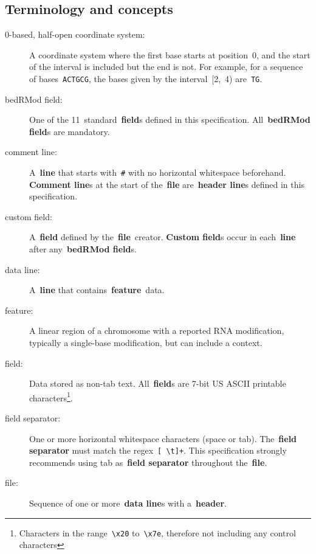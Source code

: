 \documentclass[11pt]{article}
\begin{document}
\subsection{Terminology and concepts}\label{sec:terms}
\begin{description}
\item[0-based, half-open coordinate system:]
  A coordinate system where the first base starts at position~0, and the start of the interval is included but the end is not.
  For example, for a sequence of bases~\texttt{ACTGCG}, the bases given by the interval~[2,~4) are~\texttt{TG}. %

\item[\acs{bedRMod} field:]
  One of the 11~standard~\textbf{field}s defined in this specification.
  All~\textbf{\acs{bedRMod} field}s are mandatory.

\item[comment line:]
  A~\textbf{line} that starts with~\texttt{\#} with no horizontal whitespace beforehand. \textbf{Comment line}s at the start of 
  the~\textbf{file} are~\textbf{header line}s defined in this specification.

\item[custom field:]
  A~\textbf{field} defined by the~\textbf{file}~creator.
  \textbf{Custom field}s occur in each~\textbf{line} after any~\textbf{\acs{bedRMod} field}s.

\item[data line:]
  A~\textbf{line} that contains~\textbf{feature}~data.

\item[feature:]
  A linear region of a chromosome with a reported RNA modification, typically a single-base modification, but can include a context.

\item[field:]
  Data stored as non-tab text.
  All~\textbf{field}s are 7-bit US \ac{ASCII} printable characters\footnote{Characters in the range~\texttt{{\textbackslash}x20} to~\texttt{{\textbackslash}x7e}, therefore not including any control characters}.

\item[field separator:]
  One or more horizontal whitespace characters (space or tab).
  The~\textbf{field separator} must match the \ac{regex}~\texttt{[ {\textbackslash}t]+}.
  This specification strongly recommends using tab as~\textbf{field separator} throughout the~\textbf{file}.

\item[file:]
  Sequence of one or more~\textbf{data line}s with a~\textbf{header}.


\end{description}
\end{document}
